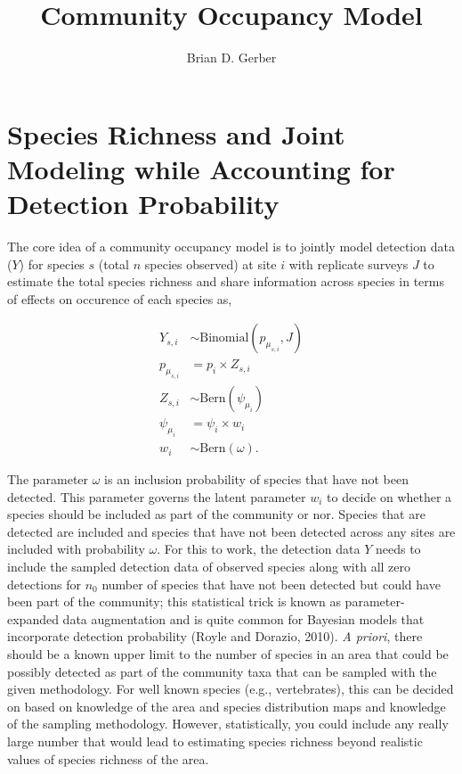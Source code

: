 \documentclass[12pt]{article}
\title{Community Occupancy Model}
\author{Brian D. Gerber}
\begin{document}
\maketitle
\section*{Species Richness and Joint Modeling while Accounting for Detection Probability}


The core idea of a community occupancy model is to jointly model detection data ($Y$) for species $s$ (total $n$ species observed) at site $i$ with replicate surveys $J$ to estimate the total species richness and share information across species in terms of effects on occurence of each species as,

\begin{align*}
Y_{s,i} &\sim \text{Binomial}(p_{\mu_{s,i}}, J)\\
p_{\mu_{s,i}} &= p_{i}\times Z_{s,i}\\
Z_{s,i} &\sim \text{Bern}(\psi_{\mu_{i}})\\
\psi_{\mu_{i}} &= \psi_{i}\times w_{i}\\
 w_{i} &\sim \text{Bern}(\omega).
\end{align*}


The parameter $\omega$ is an inclusion probability of species that have not been detected. This parameter governs the latent parameter $w_{i}$ to decide on whether a species should be included as part of the community or nor. Species that are detected are included and species that have not been detected across any sites are included with probability $\omega$. For this to work, the detection data $Y$ needs to include the sampled detection data of observed species along with all zero detections for $n_{0}$ number of species that have not been detected but could have been part of the community; this statistical trick is known as parameter-expanded data augmentation and is quite common for Bayesian models that incorporate detection probability (Royle and Dorazio, 2010). \textit{A priori}, there should be a known upper limit to the number of species in an area that could be possibly detected as part of the community taxa that can be sampled with the given methodology. For well known species (e.g., vertebrates), this can be decided on based on knowledge of the area and species distribution maps and knowledge of the sampling methodology. However, statistically, you could include any really large number that would lead to estimating species richness beyond realistic values of species richness of the area.  \\
\end{document}
